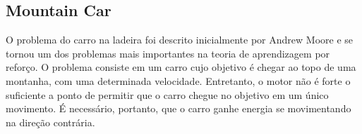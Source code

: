 \subsection{Mountain Car}\label{ssec:4ec-mc}

O problema do carro na ladeira foi descrito inicialmente por Andrew Moore \cite{moore1990efficient} e se tornou um dos problemas mais importantes na teoria de aprendizagem por reforço. O problema consiste em um carro cujo objetivo é chegar ao topo de uma montanha, com uma determinada velocidade. Entretanto, o motor não é forte o suficiente a ponto de permitir que o carro chegue no objetivo em um único movimento. É necessário, portanto, que o carro ganhe energia se movimentando na direção contrária.












